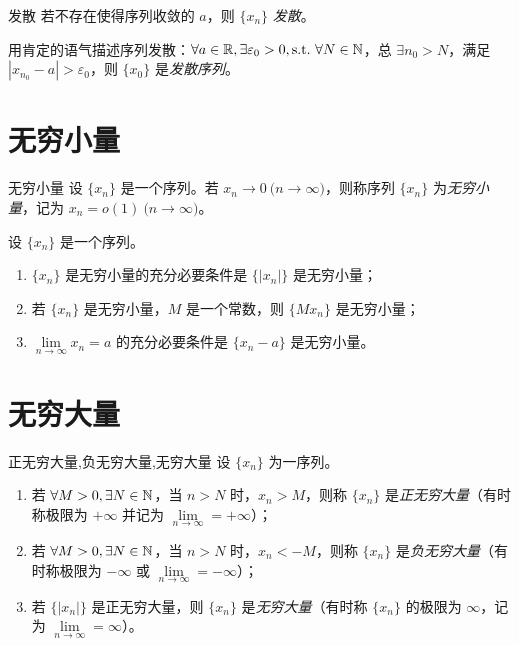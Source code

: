 \begin{definition}{发散}
	若不存在使得序列收敛的 $a$，则 $\{x_n\}$ \emph{发散}。

	用肯定的语气描述序列发散：$\forall a \in \mathbb R, \exists \varepsilon_0 > 0, \text{s.t.~} \forall N \in \mathbb N$，总 $\exists n_0 > N$，满足 $|x_{n_0} - a| > \varepsilon_0$，则 $\{x_0\}$ 是\emph{发散序列}。
\end{definition}

\section{无穷小量}

\begin{definition}{无穷小量}
	设 $\{x_n\}$ 是一个序列。若 $x_n \rightarrow 0 \pod{n \rightarrow \infty}$，则称序列 $\{x_n\}$ 为\emph{无穷小量}，记为 $x_n = o(1) \pod{n \rightarrow \infty}$。
\end{definition}

\begin{theorem}
	设 $\{x_n\}$ 是一个序列。

	\begin{enumerate}
		\item $\{x_n\}$ 是无穷小量的充分必要条件是 $\{|x_n|\}$ 是无穷小量；
		\item 若 $\{x_n\}$ 是无穷小量，$M$ 是一个常数，则 $\{M x_n\}$ 是无穷小量；
		\item $\lim\limits_{n \rightarrow \infty} x_n = a$ 的充分必要条件是 $\{x_n - a\}$ 是无穷小量。
	\end{enumerate}
\end{theorem}

\section{无穷大量}

\begin{definition}{正无穷大量,负无穷大量,无穷大量}
	设 $\{x_n\}$ 为一序列。

	\begin{enumerate}
		\item 若 $\forall M > 0, \exists N \in \mathbb N$，当 $n > N$ 时，$x_n > M$，则称 $\{x_n\}$ 是\emph{正无穷大量}（有时称极限为 $+\infty$ 并记为 $\lim\limits_{n \rightarrow \infty} = +\infty$）；
		\item 若 $\forall M > 0, \exists N \in \mathbb N$，当 $n > N$ 时，$x_n < -M$，则称 $\{x_n\}$ 是\emph{负无穷大量}（有时称极限为 $-\infty$ 或 $\lim\limits_{n \rightarrow \infty} = - \infty$）；
		\item 若 $\{|x_n|\}$ 是正无穷大量，则 $\{x_n\}$ 是\emph{无穷大量}（有时称 $\{x_n\}$ 的极限为 $\infty$，记为 $\lim\limits_{n \rightarrow \infty} = \infty$）。
	\end{enumerate}
\end{definition}

